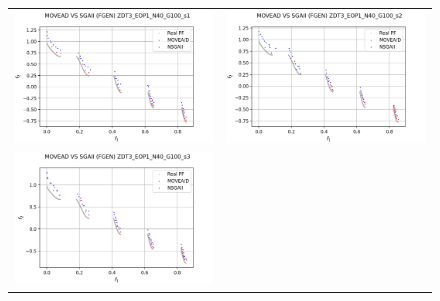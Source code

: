 \begin{figure}[H]
    \centering
    \begin{tabular}{c c}
    \includegraphics[scale=0.5]{figures/ZDT3_EOP1_N40_G100_T6/s1_comp.png} &
    \includegraphics[scale=0.5]{figures/ZDT3_EOP1_N40_G100_T6/s2_comp.png}\\
    \includegraphics[scale=0.5]{figures/ZDT3_EOP1_N40_G100_T6/s3_comp.png} &

\end{tabular}
\end{figure}
